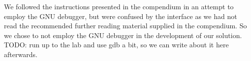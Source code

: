 We followed the instructions presented in the compendium in an attempt to employ the GNU debugger, but were confused by the interface as we had not read the recommended further reading material supplied in the compendium.
So we chose to not employ the GNU debugger in the development of our solution.
TODO: run up to the lab and use gdb a bit, so we can write about it here afterwards.

